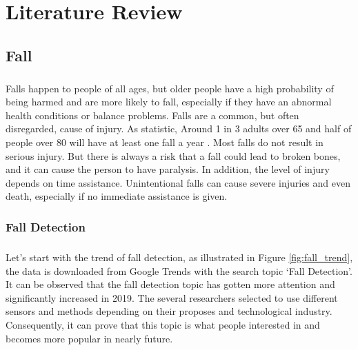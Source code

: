 \setlength{\parindent}{0in} 
\setlength{\parskip}{1em}
\setlength{\baselineskip}{1.6em}

\setlength{\footskip}{8mm}

\chapter{Literature Review} 
\label{ch:literature-review}

\section{Fall}
\label{Fall}
\paragraph{}
Falls happen to people of all ages, but older people have a high probability of being  harmed and are more likely to fall, especially if they have an abnormal health conditions or balance problems. Falls are a common, but often disregarded, cause of injury. As statistic, Around 1 in 3 adults over 65 and half of people over 80 will have at least one fall a year \cite{nhs_2019}. Most falls do not result in serious injury. But there is always a risk that a fall could lead to broken bones, and it can cause the person to have paralysis. In addition, the level of injury depends on time assistance. Unintentional falls can cause severe injuries and even death, especially if no immediate assistance is given.

\subsection{Fall Detection}
\paragraph{}
Let’s start with the trend of fall detection, as illustrated in Figure \ref{fig:fall_trend}, the data is downloaded from Google Trends with the search topic ‘Fall Detection’. It can be observed that the fall detection topic has gotten more attention and significantly increased in 2019. The several researchers selected to use different sensors and methods depending on their proposes and technological industry. Consequently, it can prove that this topic is what people interested in and  becomes more popular in nearly future.


